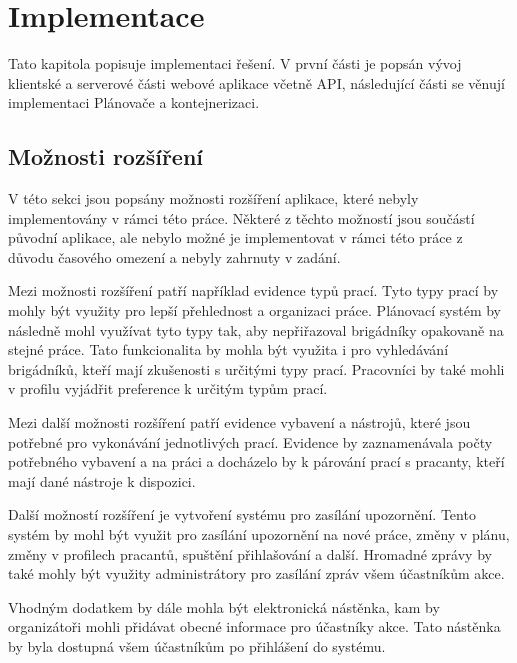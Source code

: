 \chapter{Implementace}

Tato kapitola popisuje implementaci řešení. V první části je popsán vývoj klientské a serverové části webové aplikace včetně API, následující části se 
věnují implementaci Plánovače a kontejnerizaci.






\section{Možnosti rozšíření}

V této sekci jsou popsány možnosti rozšíření aplikace, které nebyly implementovány v rámci této práce. Některé z těchto možností jsou součástí původní aplikace,
ale nebylo možné je implementovat v rámci této práce z důvodu časového omezení a nebyly zahrnuty v zadání.

Mezi možnosti rozšíření patří například evidence typů prací. Tyto typy prací by mohly být využity pro lepší přehlednost a organizaci práce. Plánovací
systém by následně mohl využívat tyto typy tak, aby nepřiřazoval brigádníky opakovaně na stejné práce. Tato funkcionalita by mohla být využita i pro
vyhledávání brigádníků, kteří mají zkušenosti s určitými typy prací. Pracovníci by také mohli v profilu vyjádřit preference k určitým typům prací.

Mezi další možnosti rozšíření patří evidence vybavení a nástrojů, které jsou potřebné pro vykonávání jednotlivých prací. Evidence by zaznamenávala
počty potřebného vybavení a na práci a docházelo by k párování prací s pracanty, kteří mají dané nástroje k dispozici.

Další možností rozšíření je vytvoření systému pro zasílání upozornění. Tento systém by mohl být využit pro zasílání upozornění na nové práce, změny
v plánu, změny v profilech pracantů, spuštění přihlašování a další. Hromadné zprávy by také mohly být využity administrátory pro zasílání zpráv všem
účastníkům akce.

Vhodným dodatkem by dále mohla být elektronická nástěnka, kam by organizátoři mohli přidávat obecné informace pro účastníky akce. Tato nástěnka by
byla dostupná všem účastníkům po přihlášení do systému.

